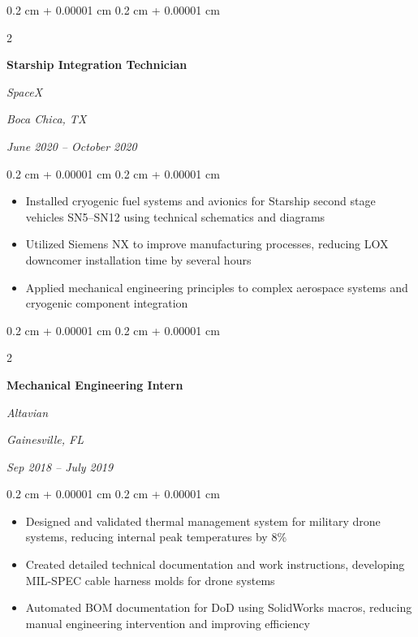 \documentclass[10pt, letterpaper]{article}
\newenvironment{highlights}{
    \begin{itemize}[
        topsep=0.10 cm,
        parsep=0.10 cm,
        partopsep=0pt,
        itemsep=0pt,
        leftmargin=0.4 cm + 10pt
    ]
}{
    \end{itemize}
} %
\newenvironment{onecolentry}{
    \begin{adjustwidth}{
        0.2 cm + 0.00001 cm
    }{
        0.2 cm + 0.00001 cm
    }
}{
    \end{adjustwidth}
} %
\newenvironment{twocolentry}[2][]{
    \onecolentry
    \def\secondColumn{#2}
    \setcolumnwidth{\fill, 9.0 cm}
    \begin{paracol}{2}
}{
    \switchcolumn \raggedleft \secondColumn
    \end{paracol}
    \endonecolentry
} %
\begin{document}
        \vspace{0.35 cm}

        \begin{twocolentry}{
        \textit{Boca Chica, TX}    
            
        \textit{June 2020 – October 2020}}
            \textbf{Starship Integration Technician}
            
            \textit{SpaceX}
        \end{twocolentry}

        \vspace{0.10 cm}
        \begin{onecolentry}
            \begin{highlights}
                \item Installed cryogenic fuel systems and avionics for Starship second stage vehicles SN5–SN12 using technical schematics and diagrams
                \item Utilized Siemens NX to improve manufacturing processes, reducing LOX downcomer installation time by several hours
                \item Applied mechanical engineering principles to complex aerospace systems and cryogenic component integration
            \end{highlights}
        \end{onecolentry}

        \vspace{0.35 cm}

        \begin{twocolentry}{
        \textit{Gainesville, FL}    
            
        \textit{Sep 2018 – July 2019}}
            \textbf{Mechanical Engineering Intern}
            
            \textit{Altavian}
        \end{twocolentry}

        \vspace{0.10 cm}
        \begin{onecolentry}
            \begin{highlights}
                \item Designed and validated thermal management system for military drone systems, reducing internal peak temperatures by 8\%
                \item Created detailed technical documentation and work instructions, developing MIL-SPEC cable harness molds for drone systems
                \item Automated BOM documentation for DoD using SolidWorks macros, reducing manual engineering intervention and improving efficiency
            \end{highlights}
        \end{onecolentry}
\end{document}
